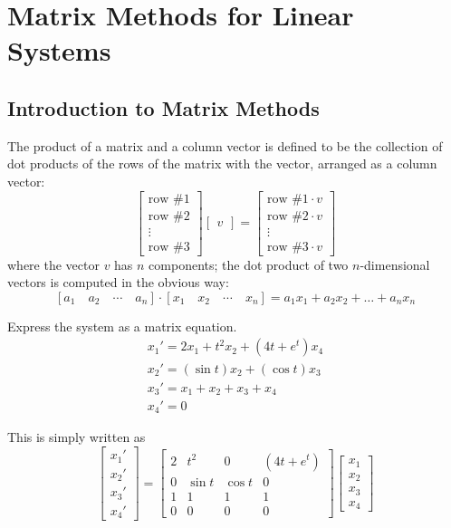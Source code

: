 \documentclass[../diffeq.tex]{subfiles}
\begin{document}
\chapter{Matrix Methods for Linear Systems}
\section{Introduction to Matrix Methods}
The product of a matrix and a column vector is defined to be the collection of dot products of the rows of the matrix with the vector, arranged as a column vector:
\[ \begin{bmatrix}
    \text{row \# 1}\\
    \text{row \# 2}\\
    \vdots \\
    \text{row \# 3} 
\end{bmatrix}
\begin{bmatrix}
    v
\end{bmatrix}=
\begin{bmatrix}
    \text{row \# 1}\cdot v\\
    \text{row \# 2}\cdot v\\
    \vdots \\
    \text{row \# 3}\cdot v 
\end{bmatrix}
\]
where the vector $v$ has $n$ components; the dot product of two $n$-dimensional vectors is computed in the obvious way:
\[ [a_1 \quad a_2 \quad \cdots \quad a_n]\cdot [x_1 \quad x_2 \quad \cdots \quad x_n]=a_1x_1+a_2x_2+\dots + a_nx_n\]

\begin{example}
    Express the system as a matrix equation.
    \begin{align*}
        x_1'=2x_1+t^2x_2+(4t+e^t)x_4 \\
        x_2'=(\sin t)x_2+(\cos t)x_3 \\
        x_3' = x_1+x_2+x_3+x_4 \\
        x_4' = 0
    \end{align*}

    This is simply written as 
    \[ \begin{bmatrix}
        x_1'\\
        x_2'\\
        x_3'\\
        x_4'
    \end{bmatrix}=
    \begin{bmatrix}
        2 & t^2 & 0 & (4t+e^t) \\
        0 & \sin t & \cos t & 0 \\
        1 & 1 & 1 & 1\\
        0 & 0 & 0 & 0
    \end{bmatrix}\begin{bmatrix}
        x_1\\x_2\\x_3\\x_4
    \end{bmatrix}\]
\end{example}
\end{document}
